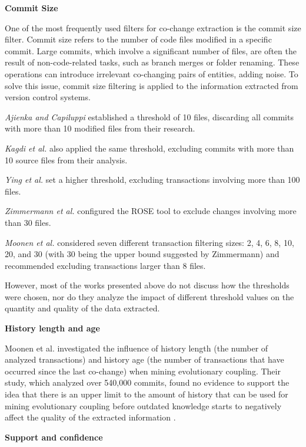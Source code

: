 \textbf{Commit Size}  

One of the most frequently used filters for co-change extraction is the commit size filter. Commit size refers to the number of code files modified in a specific commit. Large commits, which involve a significant number of files, are often the result of non-code-related tasks, such as branch merges or folder renaming. These operations can introduce irrelevant co-changing pairs of entities, adding noise. To solve this issue, commit size filtering is applied to the information extracted from version control systems.

\textit{Ajienka and Capiluppi} \cite{DBLP:journals/jss/AjienkaC17} established a threshold of 10 files, discarding all commits with more than 10 modified files from their research.

\textit{Kagdi et al.} also applied the same threshold, excluding commits with more than 10 source files from their analysis.

\textit{Ying et al.} \cite{Ying-co-change} set a higher threshold, excluding transactions involving more than 100 files.

\textit{Zimmermann et al.} \cite{Zimmermann:2004:MVH:998675.999460} configured the ROSE tool to exclude changes involving more than 30 files.

\textit{Moonen et al.} \cite{Moonen-commit} considered seven different transaction filtering sizes: 2, 4, 6, 8, 10, 20, and 30 (with 30 being the upper bound suggested by Zimmermann) and recommended excluding transactions larger than 8 files.

However, most of the works presented above do not discuss how the thresholds were chosen, nor do they analyze the impact of different threshold values on the quantity and quality of the data extracted.


\textbf{History length and age}

Moonen et al. investigated the influence of history length (the number of analyzed transactions) and history age (the number of transactions that have occurred since the last co-change) when mining evolutionary coupling. Their study, which analyzed over 540,000 commits, found no evidence to support the idea that there is an upper limit to the amount of history that can be used for mining evolutionary coupling before outdated knowledge starts to negatively affect the quality of the extracted information \cite{article-Moonen}.

\textbf{Support and confidence}

